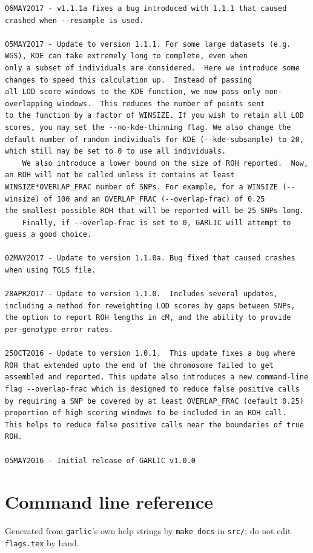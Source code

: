 \documentclass[12pt]{article}%
\begin{document}
\begin{lstlisting}
06MAY2017 - v1.1.1a fixes a bug introduced with 1.1.1 that caused crashed when --resample is used.

05MAY2017 - Update to version 1.1.1. For some large datasets (e.g. WGS), KDE can take extremely long to complete, even when
only a subset of individuals are considered.  Here we introduce some changes to speed this calculation up.  Instead of passing
all LOD score windows to the KDE function, we now pass only non-overlapping windows.  This reduces the number of points sent
to the function by a factor of WINSIZE. If you wish to retain all LOD scores, you may set the --no-kde-thinning flag. We also change the default number of random individuals for KDE (--kde-subsample) to 20, which still may be set to 0 to use all individuals. 
	We also introduce a lower bound on the size of ROH reported.  Now, an ROH will not be called unless it contains at least
WINSIZE*OVERLAP_FRAC number of SNPs. For example, for a WINSIZE (--winsize) of 100 and an OVERLAP_FRAC (--overlap-frac) of 0.25
the smallest possible ROH that will be reported will be 25 SNPs long.
	Finally, if --overlap-frac is set to 0, GARLIC will attempt to guess a good choice.

02MAY2017 - Update to version 1.1.0a. Bug fixed that caused crashes when using TGLS file. 

28APR2017 - Update to version 1.1.0.  Includes several updates, including a method for reweighting LOD scores by gaps between SNPs, the option to report ROH lengths in cM, and the ability to provide per-genotype error rates.

25OCT2016 - Update to version 1.0.1.  This update fixes a bug where ROH that extended upto the end of the chromosome failed to get assembled and reported. This update also introduces a new command-line flag --overlap-frac which is designed to reduce false positive calls by requiring a SNP be covered by at least OVERLAP_FRAC (default 0.25) proportion of high scoring windows to be included in an ROH call.  This helps to reduce false positive calls near the boundaries of true ROH.

05MAY2016 - Initial release of GARLIC v1.0.0
\end{lstlisting}

\appendix
\section{Command line reference}
\label{app:flags}

\noindent Generated from {\tt garlic}'s own help strings by {\tt make docs} in
{\tt src/}; do not edit {\tt flags.tex} by hand.



\end{document}
